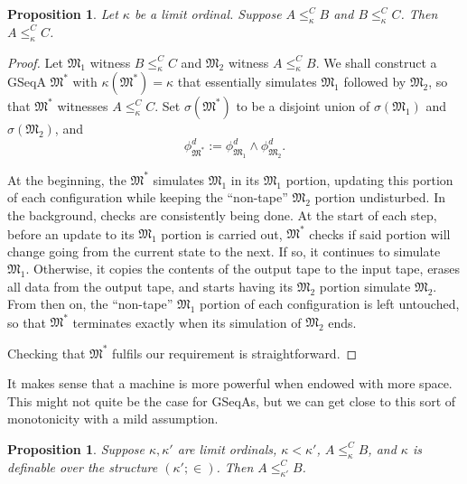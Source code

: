 \documentclass[12pt, twoside]{memoir}
\numberwithin{equation}{section}
\newtheorem{prop}[thm]{Proposition}
\theoremstyle{definition}
\theoremstyle{remark}
\theoremstyle{definition}
\theoremstyle{definition}
\theoremstyle{definition}
\theoremstyle{remark}
\begin{document}
\begin{prop}\label{prop245}
Let $\kappa$ be a limit ordinal. Suppose $A \leq^C_{\kappa} B$ and $B \leq^C_{\kappa} C$. Then $A \leq^C_{\kappa} C$.
\end{prop}

\begin{proof}
Let $\mathfrak{M}_1$ witness $B \leq^C_{\kappa} C$ and $\mathfrak{M}_2$ witness $A \leq^C_{\kappa} B$. We shall construct a GSeqA $\mathfrak{M}^*$ with $\kappa(\mathfrak{M}^*) = \kappa$ that essentially simulates $\mathfrak{M}_1$ followed by $\mathfrak{M}_2$, so that $\mathfrak{M}^*$ witnesses $A \leq^C_{\kappa} C$. Set $\sigma(\mathfrak{M}^*)$ to be a disjoint union of $\sigma(\mathfrak{M}_1)$ and $\sigma(\mathfrak{M}_2)$, and 
\begin{equation*}
    \phi^d_{\mathfrak{M}^*} := \phi^d_{\mathfrak{M}_1} \wedge \phi^d_{\mathfrak{M}_2} \text{.}
\end{equation*}

At the beginning, the $\mathfrak{M}^*$ simulates $\mathfrak{M}_1$ in its $\mathfrak{M}_1$ portion, updating this portion of each configuration while keeping the ``non-tape'' $\mathfrak{M}_2$ portion undisturbed. In the background, checks are consistently being done. At the start of each step, before an update to its $\mathfrak{M}_1$ portion is carried out, $\mathfrak{M}^*$ checks if said portion will change going from the current state to the next. If so, it continues to simulate $\mathfrak{M}_1$. Otherwise, it copies the contents of the output tape to the input tape, erases all data from the output tape, and starts having its $\mathfrak{M}_2$ portion simulate $\mathfrak{M}_2$. From then on, the ``non-tape'' $\mathfrak{M}_1$ portion of each configuration is left untouched, so that $\mathfrak{M}^*$ terminates exactly when its simulation of $\mathfrak{M}_2$ ends.

Checking that $\mathfrak{M}^*$ fulfils our requirement is straightforward.
\end{proof}

It makes sense that a machine is more powerful when endowed with more space. This might not quite be the case for GSeqAs, but we can get close to this sort of monotonicity with a mild assumption.

\begin{prop}\label{prop246}
Suppose $\kappa, \kappa'$ are limit ordinals, $\kappa < \kappa'$, $A \leq^C_{\kappa} B$, and $\kappa$ is definable over the structure $(\kappa'; \in)$. Then $A \leq^C_{\kappa'} B$.
\end{prop}
\end{document}

